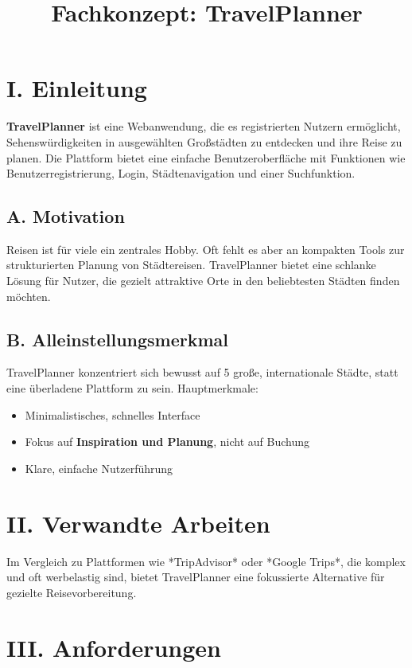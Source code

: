 \documentclass[a4paper,12pt]{article}
\title{Fachkonzept: TravelPlanner}
\author{}
\date{}
\begin{document}
    \maketitle

    \section*{I. Einleitung}
    \textbf{TravelPlanner} ist eine Webanwendung, die es registrierten Nutzern ermöglicht, Sehenswürdigkeiten in ausgewählten Großstädten zu entdecken und ihre Reise zu planen.
    Die Plattform bietet eine einfache Benutzeroberfläche mit Funktionen wie Benutzerregistrierung, Login, Städtenavigation und einer Suchfunktion.

    \subsection*{A. Motivation}
    Reisen ist für viele ein zentrales Hobby. Oft fehlt es aber an kompakten Tools zur strukturierten Planung von Städtereisen.
    TravelPlanner bietet eine schlanke Lösung für Nutzer, die gezielt attraktive Orte in den beliebtesten Städten finden möchten.

    \subsection*{B. Alleinstellungsmerkmal}
    TravelPlanner konzentriert sich bewusst auf 5 große, internationale Städte, statt eine überladene Plattform zu sein.
    Hauptmerkmale:
    \begin{itemize}
        \item Minimalistisches, schnelles Interface
        \item Fokus auf \textbf{Inspiration und Planung}, nicht auf Buchung
        \item Klare, einfache Nutzerführung
    \end{itemize}

    \section*{II. Verwandte Arbeiten}
    Im Vergleich zu Plattformen wie *TripAdvisor* oder *Google Trips*, die komplex und oft werbelastig sind, bietet TravelPlanner eine fokussierte Alternative für gezielte Reisevorbereitung.

    \section*{III. Anforderungen}
\end{document}
